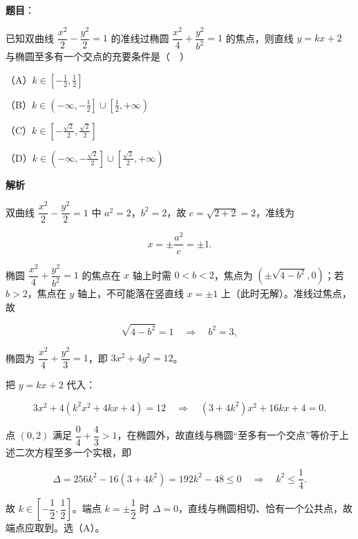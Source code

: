 \begin{answer}

\textbf{题目}：

已知双曲线 $\dfrac{x^2}{2}-\dfrac{y^2}{2}=1$ 的准线过椭圆 $\dfrac{x^2}{4}+\dfrac{y^2}{b^2}=1$ 的焦点，则直线 $y=kx+2$ 与椭圆至多有一个交点的充要条件是（　）

（A）$k\in\left[-\frac12,\frac12\right]$

（B）$k\in\left(-\infty,-\frac12\right]\cup\left[\frac12,+\infty\right)$

（C）$k\in\left[-\frac{\sqrt2}{2},\frac{\sqrt2}{2}\right]$

（D）$k\in\left(-\infty,-\frac{\sqrt2}{2}\right]\cup\left[\frac{\sqrt2}{2},+\infty\right)$

\textbf{解析}

双曲线 $\dfrac{x^2}{2}-\dfrac{y^2}{2}=1$ 中 $a^2=2$，$b^2=2$，故 $c=\sqrt{2+2}=2$，准线为

\nopagebreak[4]
\[x=\pm\frac{a^2}{c}=\pm1.\]

椭圆 $\dfrac{x^2}{4}+\dfrac{y^2}{b^2}=1$ 的焦点在 $x$ 轴上时需 $0<b<2$，焦点为 $(\pm\sqrt{4-b^2},0)$；若 $b>2$，焦点在 $y$ 轴上，不可能落在竖直线 $x=\pm1$ 上（此时无解）。准线过焦点，故

\nopagebreak[4]
\[\sqrt{4-b^2}=1\quad\Longrightarrow\quad b^2=3,\]

椭圆为 $\dfrac{x^2}{4}+\dfrac{y^2}{3}=1$，即 $3x^2+4y^2=12$。

把 $y=kx+2$ 代入：

\nopagebreak[4]
\[3x^2+4(k^2x^2+4kx+4)=12\quad\Longrightarrow\quad(3+4k^2)x^2+16kx+4=0.\]

点 $(0,2)$ 满足 $\dfrac{0}{4}+\dfrac{4}{3}>1$，在椭圆外，故直线与椭圆“至多有一个交点”等价于上述二次方程至多一个实根，即

\nopagebreak[4]
\[\Delta=256k^2-16(3+4k^2)=192k^2-48\leqslant0\quad\Longrightarrow\quad k^2\leqslant\frac14.\]

故 $k\in\left[-\dfrac12,\dfrac12\right]$。端点 $k=\pm\dfrac12$ 时 $\Delta=0$，直线与椭圆相切、恰有一个公共点，故端点应取到。选（A）。


\end{answer}
